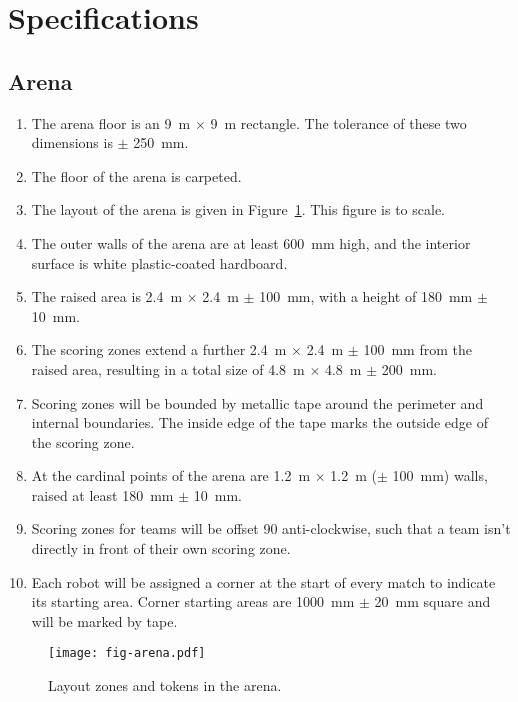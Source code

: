 \section{Specifications}
\label{sec:specs}

\subsection{Arena}
\label{spec:arena}

\begin{enumerate}
  \item The arena floor is an \SI{9}{m} $\times$ \SI{9}{m} rectangle. The
        tolerance of these two dimensions is $\pm$ \SI{250}{mm}.
  \item The floor of the arena is carpeted.
  \item The layout of the arena is given in Figure~\ref{fig:arena}. This
        figure is to scale.
  \item The outer walls of the arena are at least \SI{600}{mm} high, and the
        interior surface is white plastic-coated hardboard.
  \item The raised area is \SI{2.4}{m} $\times$ \SI{2.4}{m} $\pm$ \SI{100}{mm},
        with a height of \SI{180}{mm} $\pm$ \SI{10}{mm}.
  \item The scoring zones extend a further \SI{2.4}{m} $\times$ \SI{2.4}{m} $\pm$ \SI{100}{mm}
        from the raised area, resulting in a total size of \SI{4.8}{m} $\times$ \SI{4.8}{m} $\pm$ \SI{200}{mm}.
  \item Scoring zones will be bounded by metallic tape around the perimeter
        and internal boundaries. The inside edge of the tape marks the outside
        edge of the scoring zone.
  \item At the cardinal points of the arena are \SI{1.2}{m} $\times$ \SI{1.2}{m} ($\pm$ \SI{100}{mm}) walls,
        raised at least \SI{180}{mm} $\pm$ \SI{10}{mm}.
  \item Scoring zones for teams will be offset 90\degree{} anti-clockwise, such
        that a team isn't directly in front of their own scoring zone.
  \item Each robot will be assigned a corner at the start of every match to indicate its starting area.
        Corner starting areas are \SI{1000}{mm} $\pm$ \SI{20}{mm} square and will be marked by tape.
\end{enumerate}

\begin{figure}
  \texttt{[image: fig-arena.pdf]}
  \caption{Layout zones and tokens in the arena.}
  \label{fig:arena}
\end{figure}

